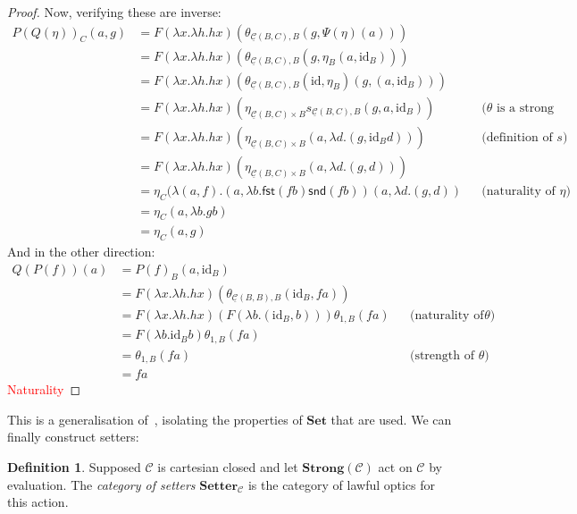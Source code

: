 \documentclass[11pt,a4paper]{article}
\theoremstyle{plain}
\theoremstyle{definition}
\newtheorem{definition}[theorem]{Definition}
\newcommand{\C}{\mathscr{C}}
\newcommand{\homC}{\underline{\C}}
\newcommand{\Set}{\mathbf{Set}}
\newcommand{\Strong}{\mathbf{Strong}}
\newcommand{\Setter}{\mathbf{Setter}}
\newcommand{\id}{\mathrm{id}}
\newcommand{\todo}[1]{\textcolor{red}{\small #1}}
\begin{document}
\begin{proof}
  Now, verifying these are inverse:
  \begin{align*}
    P(Q(\eta))_C (a,g)
    &= F(\lambda x. \lambda h. h x)(\theta_{\homC(B, C), B}(g, \Psi(\eta)(a))) \\
    &= F(\lambda x. \lambda h. h x)(\theta_{\homC(B, C), B}(g, \eta_B(a, \id_B))) \\
    &= F(\lambda x. \lambda h. h x)(\theta_{\homC(B, C), B}(\id, \eta_B)(g, (a, \id_B))) \\
    &= F(\lambda x. \lambda h. h x)(\eta_{\homC(B, C) \times B} s_{\homC(B, C), B}(g, a, \id_B)) && \text{($\theta$ is a strong transformation)}\\
    &= F(\lambda x. \lambda h. h x)(\eta_{\homC(B, C) \times B} (a, \lambda d. (g, \id_B d)) ) && \text{(definition of $s$)}\\
    &= F(\lambda x. \lambda h. h x)(\eta_{\homC(B, C) \times B} (a, \lambda d. (g, d)) ) \\
    &= \eta_{C}(\lambda (a, f). (a, \lambda b. \mathsf{fst}(f b)\mathsf{snd}(f b)) (a, \lambda d. (g, d)) && \text{(naturality of $\eta$)}\\
    &= \eta_{C}(a, \lambda b. g b) \\
    &= \eta_{C}(a, g)
  \end{align*}
  And in the other direction:
  \begin{align*}
    Q(P(f))(a)
    &= P(f)_B(a, \id_B) \\
    &= F(\lambda x. \lambda h. h x)(\theta_{\homC(B, B), B}(\id_B, f a))\\
    &= F(\lambda x. \lambda h. h x)(F(\lambda b. (\id_B, b)))\theta_{1, B}(f a) && \text{(naturality of $\theta$)}\\
    &= F(\lambda b. \id_B b)\theta_{1, B}(f a)\\
    &= \theta_{1, B}(f a) && \text{(strength of $\theta$)}\\
    &= f a
  \end{align*}
\todo{Naturality}
\end{proof}

This is a generalisation of~\cite[Proposition 2.2]{SecondOrderFunctionals}, isolating the properties of $\Set$ that are used. We can finally construct setters:

\begin{definition}
  Supposed $\C$ is cartesian closed and let $\Strong(\C)$ act on $\C$ by evaluation. The \emph{category of setters} $\Setter_\C$ is the category of lawful optics for this action.
\end{definition}
\end{document}
